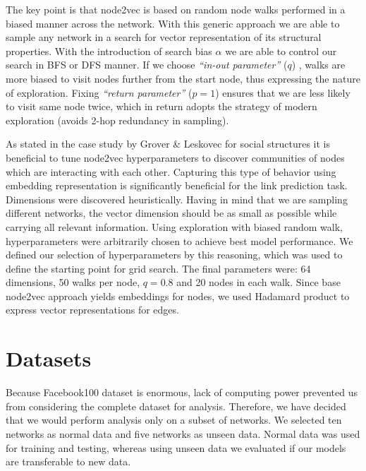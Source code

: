 \documentclass[9pt,twocolumn,twoside]{pnas-new}
\begin{document}
The key point is that node2vec is based on random node walks performed in a biased manner across the network. With this generic approach we are able to sample any network in a search for vector representation of its structural properties. With the introduction of search bias $\alpha$ we are able to control our search in BFS or DFS manner. If we choose \textit{“in-out parameter”} ($q$) , walks are more biased to visit nodes further from the start node, thus expressing the nature of exploration. Fixing \textit{“return parameter”} ($p=1$) ensures that we are less likely to visit same node twice, which in return adopts the strategy of modern exploration (avoids 2-hop redundancy in sampling).

As stated in the case study by Grover \& Leskovec \cite{Grover2016} for social structures it is beneficial to tune node2vec hyperparameters to discover communities of nodes which are interacting with each other. Capturing this type of behavior using embedding representation is significantly beneficial for the link prediction task. Dimensions were discovered heuristically. Having in mind that we are sampling different networks, the vector dimension should be as small as possible while carrying all relevant information. Using exploration with biased random walk, hyperparameters were arbitrarily chosen to achieve best model performance. We defined our selection of hyperparameters by this reasoning, which was used to define the starting point for grid search. The final parameters were: 64 dimensions, 50 walks per node, $q = 0.8$ and 20 nodes in each walk.
Since base node2vec approach yields embeddings for nodes, we used Hadamard product to express vector representations for edges. 





\section*{Datasets}

Because Facebook100 dataset is enormous, lack of computing power prevented us from considering the complete dataset for analysis. Therefore, we have decided that we would perform analysis only on a subset of  networks. We selected ten networks as normal data and five networks as unseen data. Normal data was used for training and testing, whereas using unseen data we evaluated if our models are transferable to new data.
\end{document}
